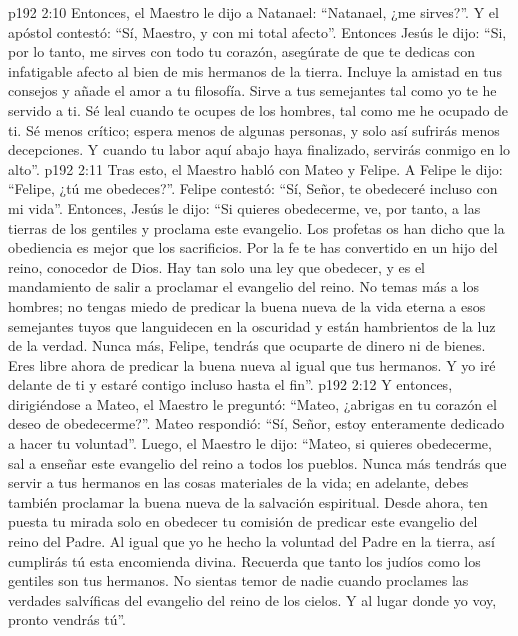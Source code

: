 \vs p192 2:10 Entonces, el Maestro le dijo a Natanael: “Natanael, ¿me sirves?”. Y el apóstol contestó: “Sí, Maestro, y con mi total afecto”. Entonces Jesús le dijo: “Si, por lo tanto, me sirves con todo tu corazón, asegúrate de que te dedicas con infatigable afecto al bien de mis hermanos de la tierra. Incluye la amistad en tus consejos y añade el amor a tu filosofía. Sirve a tus semejantes tal como yo te he servido a ti. Sé leal cuando te ocupes de los hombres, tal como me he ocupado de ti. Sé menos crítico; espera menos de algunas personas, y solo así sufrirás menos decepciones. Y cuando tu labor aquí abajo haya finalizado, servirás conmigo en lo alto”.
\vs p192 2:11 \pc Tras esto, el Maestro habló con Mateo y Felipe. A Felipe le dijo: “Felipe, ¿tú me obedeces?”. Felipe contestó: “Sí, Señor, te obedeceré incluso con mi vida”. Entonces, Jesús le dijo: “Si quieres obedecerme, ve, por tanto, a las tierras de los gentiles y proclama este evangelio. Los profetas os han dicho que la obediencia es mejor que los sacrificios. Por la fe te has convertido en un hijo del reino, conocedor de Dios. Hay tan solo una ley que obedecer, y es el mandamiento de salir a proclamar el evangelio del reino. No temas más a los hombres; no tengas miedo de predicar la buena nueva de la vida eterna a esos semejantes tuyos que languidecen en la oscuridad y están hambrientos de la luz de la verdad. Nunca más, Felipe, tendrás que ocuparte de dinero ni de bienes. Eres libre ahora de predicar la buena nueva al igual que tus hermanos. Y yo iré delante de ti y estaré contigo incluso hasta el fin”.
\vs p192 2:12 Y entonces, dirigiéndose a Mateo, el Maestro le preguntó: “Mateo, ¿abrigas en tu corazón el deseo de obedecerme?”. Mateo respondió: “Sí, Señor, estoy enteramente dedicado a hacer tu voluntad”. Luego, el Maestro le dijo: “Mateo, si quieres obedecerme, sal a enseñar este evangelio del reino a todos los pueblos. Nunca más tendrás que servir a tus hermanos en las cosas materiales de la vida; en adelante, debes también proclamar la buena nueva de la salvación espiritual. Desde ahora, ten puesta tu mirada solo en obedecer tu comisión de predicar este evangelio del reino del Padre. Al igual que yo he hecho la voluntad del Padre en la tierra, así cumplirás tú esta encomienda divina. Recuerda que tanto los judíos como los gentiles son tus hermanos. No sientas temor de nadie cuando proclames las verdades salvíficas del evangelio del reino de los cielos. Y al lugar donde yo voy, pronto vendrás tú”.
